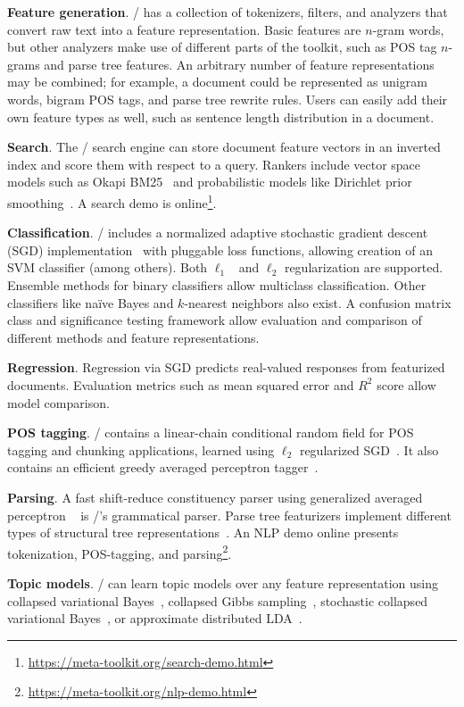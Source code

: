 \textbf{Feature generation}.
\meta/ has a collection of tokenizers, filters, and analyzers that convert raw
text into a feature representation. Basic features are $n$-gram words, but other
analyzers make use of different parts of the toolkit, such as POS tag $n$-grams
and parse tree features. An arbitrary number of feature representations may be
combined; for example, a document could be represented as unigram words, bigram
POS tags, and parse tree rewrite rules. Users can easily add their own feature
types as well, such as sentence length distribution in a document.

\textbf{Search}.
The \meta/ search engine can store document feature vectors in an inverted index
and score them with respect to a query. Rankers include vector space models such
as Okapi BM25~\citep{bm25} and probabilistic models like Dirichlet prior
smoothing~\citep{zhai-lm}. A search demo is
online\footnote{\url{https://meta-toolkit.org/search-demo.html}}.

\textbf{Classification}.
\meta/ includes a normalized adaptive stochastic gradient descent (SGD)
implementation~\citep{Ross:2013:UAI} with pluggable loss functions, allowing
creation of an SVM classifier (among others). Both
$\ell_1$~\citep{Tsuruoka:2009:ACLIJCNLP} and $\ell_2$ regularization are
supported. Ensemble methods for binary classifiers allow multiclass
classification. Other classifiers like na{\"i}ve Bayes and $k$-nearest
neighbors also exist. A confusion matrix class and significance testing
framework allow evaluation and comparison of different methods and feature
representations.

\textbf{Regression}.
Regression via SGD predicts real-valued responses from featurized documents.
Evaluation metrics such as mean squared error and $R^2$ score allow model
comparison.

\textbf{POS tagging}.
\meta/ contains a linear-chain conditional random field for POS tagging and
chunking applications, learned using $\ell_2$ regularized SGD~\citep{crf}. It
also contains an efficient greedy averaged perceptron tagger~\citep{greedy}.

\textbf{Parsing}.
A fast shift-reduce constituency parser using generalized averaged perceptron
~\citep{const-parsing} is \meta/'s grammatical parser. Parse tree featurizers
implement different types of structural tree representations~\citep{structural}.
An NLP demo online presents tokenization, POS-tagging, and
parsing\footnote{\url{https://meta-toolkit.org/nlp-demo.html}}.

\textbf{Topic models}.
\meta/ can learn topic models over any feature representation using collapsed
variational Bayes~\citep{cvb}, collapsed Gibbs sampling~\citep{gibbs}, stochastic
collapsed variational Bayes~\citep{scvb}, or approximate distributed
LDA~\citep{pargibbs}.

